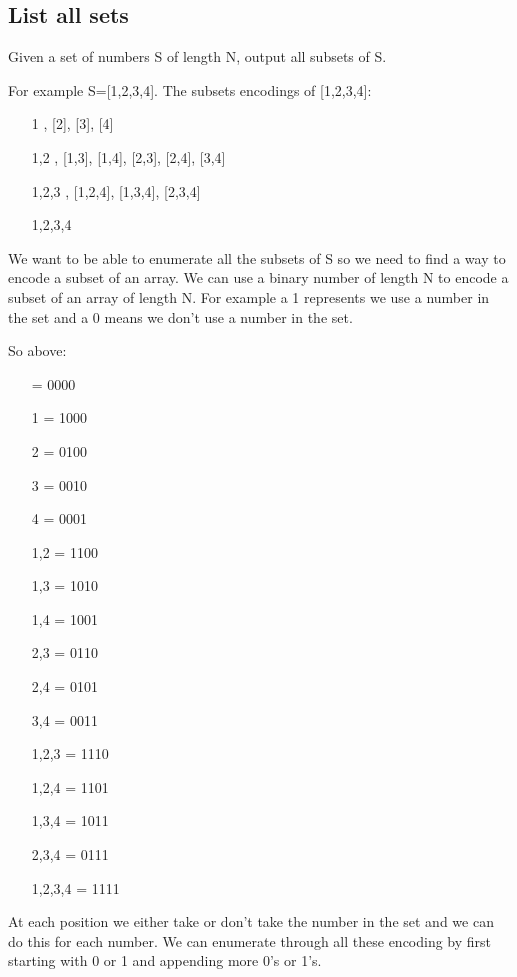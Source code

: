 \documentclass[11pt,oneside]{book}
\begin{document}
\subsection{List all sets}

Given a set of numbers S of length N, output all subsets of S.

For example S=[1,2,3,4]. The subsets encodings of [1,2,3,4]:

\begin{itemize}
\item []
\item [1], [2], [3], [4]
\item [1,2], [1,3], [1,4], [2,3], [2,4], [3,4]
\item [1,2,3], [1,2,4], [1,3,4], [2,3,4]
\item [1,2,3,4]
\end{itemize}

We want to be able to enumerate all the subsets of S so we need to find a way to encode a subset of an array. We can use a binary number of length N to encode a subset of an array of length N. For example a 1 represents we use a number in the set and a 0 means we don't use a number in the set.

So above:

\begin{itemize}
\item [] = 0000
\item [1] = 1000
\item [2] = 0100
\item [3] = 0010
\item [4] = 0001
\item [1,2] = 1100
\item [1,3] = 1010
\item [1,4] = 1001
\item [2,3] = 0110
\item [2,4] = 0101
\item [3,4] = 0011
\item [1,2,3] = 1110
\item [1,2,4] = 1101
\item [1,3,4] = 1011
\item [2,3,4] = 0111
\item [1,2,3,4] = 1111
\end{itemize}

At each position we either take or don't take the number in the set and we can do this for each number. We can enumerate through all these encoding by first starting with 0 or 1 and appending more 0's or 1's.
\end{document}
